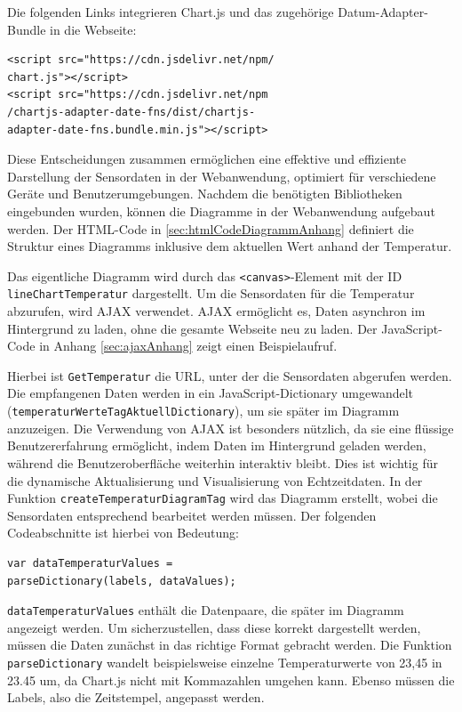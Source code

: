 \documentclass[conference]{IEEEtran}
\begin{document}
Die folgenden Links integrieren Chart.js und das zugehörige Datum-Adapter-Bundle in die Webseite:
\begin{verbatim}
<script src="https://cdn.jsdelivr.net/npm/
chart.js"></script>
<script src="https://cdn.jsdelivr.net/npm
/chartjs-adapter-date-fns/dist/chartjs-
adapter-date-fns.bundle.min.js"></script>
\end{verbatim}
Diese Entscheidungen zusammen ermöglichen eine effektive und effiziente Darstellung der Sensordaten in der Webanwendung, optimiert für verschiedene Geräte und Benutzerumgebungen.
Nachdem die benötigten Bibliotheken eingebunden wurden, können die Diagramme in der Webanwendung aufgebaut werden. Der  HTML-Code in \ref{sec:htmlCodeDiagrammAnhang} definiert die Struktur eines Diagramms inklusive dem aktuellen Wert anhand der Temperatur.

Das eigentliche Diagramm wird durch das \texttt{<canvas>}-Element mit der ID \texttt{lineChartTemperatur} dargestellt.
Um die Sensordaten für die Temperatur abzurufen, wird AJAX verwendet. AJAX ermöglicht es, Daten asynchron im Hintergrund zu laden, ohne die gesamte Webseite neu zu laden. Der JavaScript-Code in Anhang \ref{sec:ajaxAnhang} zeigt einen Beispielaufruf.

Hierbei ist \texttt{GetTemperatur} die URL, unter der die Sensordaten abgerufen werden. Die empfangenen Daten werden in ein JavaScript-Dictionary umgewandelt (\texttt{temperaturWerteTagAktuellDictionary}), um sie später im Diagramm anzuzeigen.
Die Verwendung von AJAX ist besonders nützlich, da sie eine flüssige Benutzererfahrung ermöglicht, indem Daten im Hintergrund geladen werden, während die Benutzeroberfläche weiterhin interaktiv bleibt. Dies ist wichtig für die dynamische Aktualisierung und Visualisierung von Echtzeitdaten.
In der Funktion \texttt{createTemperaturDiagramTag} wird das Diagramm erstellt, wobei die Sensordaten entsprechend bearbeitet werden müssen. Der folgenden Codeabschnitte ist hierbei von Bedeutung:
\begin{verbatim}var dataTemperaturValues = 
parseDictionary(labels, dataValues); \end{verbatim}
\texttt{dataTemperaturValues} enthält die Datenpaare, die später im Diagramm angezeigt werden. Um sicherzustellen, dass diese korrekt dargestellt werden, müssen die Daten zunächst in das richtige Format gebracht werden. Die Funktion \texttt{parseDictionary} wandelt beispielsweise einzelne Temperaturwerte von 23,45 in 23.45 um, da Chart.js nicht mit Kommazahlen umgehen kann. Ebenso müssen die Labels, also die Zeitstempel, angepasst werden.
\end{document}
